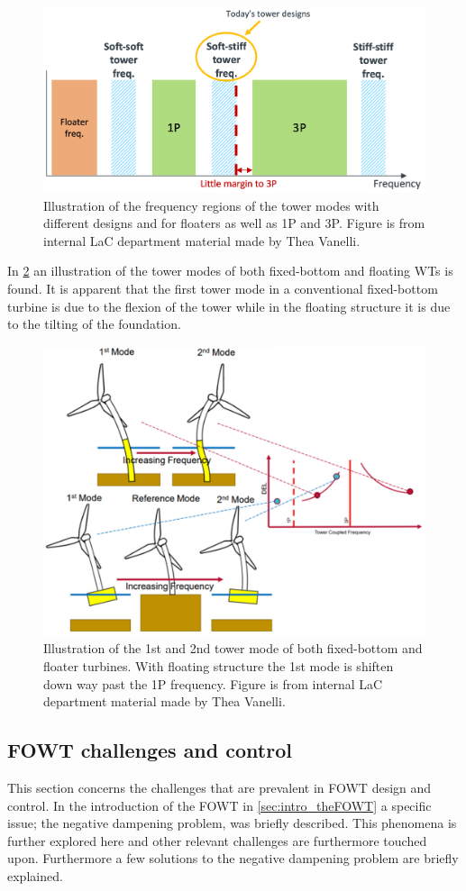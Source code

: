 \begin{figure}[ht]
	\centering
	\includegraphics[width=0.7\linewidth]{Graphics/1Pand3PvsTwrStiff.PNG}
	\caption{Illustration of the frequency regions of the tower modes with different designs and for floaters as well as 1P and 3P. Figure is from internal LaC department material made by Thea Vanelli.}
	\label{fig:1p_and3p}
\end{figure}
In \cref{fig:eigen_and_1p3p} an illustration of the tower modes of both fixed-bottom and floating WTs is found. It is apparent that the first tower mode in a conventional fixed-bottom turbine is due to the flexion of the tower while in the floating structure it is due to the tilting of the foundation.
\begin{figure}[ht]
	\centering
	\includegraphics[width=0.7\linewidth]{Graphics/1P3PandEigenFloater.png}
	\caption{Illustration of the 1st and 2nd tower mode of both fixed-bottom and floater turbines. With floating structure the 1st mode is shiften down way past the 1P frequency. Figure is from internal LaC department material made by Thea Vanelli.}
	\label{fig:eigen_and_1p3p}
\end{figure}

\clearpage \newpage
\subsection{FOWT challenges and control} \label{sec:theory_fowt_challenges}
This section concerns the challenges that are prevalent in FOWT design and control. In the introduction of the FOWT in \cref{sec:intro_theFOWT} a specific issue; the negative dampening problem, was briefly described. This phenomena is further explored here and other relevant challenges are furthermore touched upon. Furthermore a few solutions to the negative dampening problem are briefly explained.

